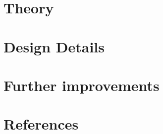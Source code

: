 \documentclass[a4paper]{article}
\begin{document}
\section*{Theory}

\section*{Design Details}

\section*{Further improvements}

\section*{References}
\end{document}
